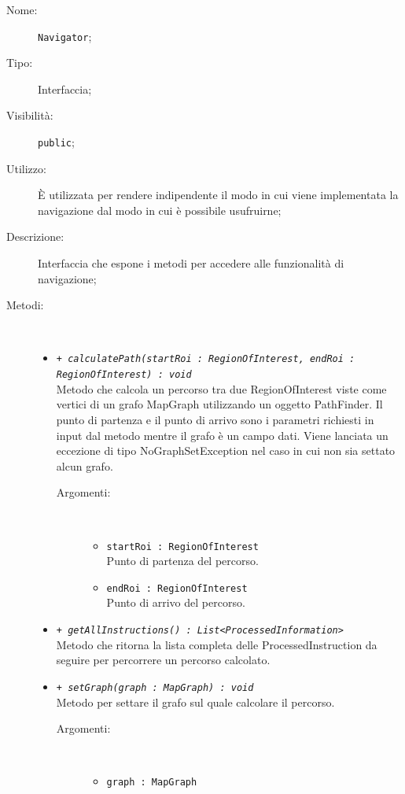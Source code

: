 \documentclass[../DefinizioneDiProdotto.tex]{subfiles}
\begin{document}
    \begin{description}
\item[Nome:] \texttt{Navigator};
\item[Tipo:] Interfaccia;
\item[Visibilità:] \texttt{public};
\item[Utilizzo:] È utilizzata per rendere indipendente il modo in cui viene implementata la navigazione dal modo in cui è possibile usufruirne;
\item[Descrizione:] Interfaccia che espone i metodi per accedere alle funzionalità di navigazione;
\item[Metodi:] \
\begin{itemize}
\item \texttt{+ \textit{calculatePath(startRoi : RegionOfInterest, endRoi : RegionOfInterest) : void}}\\
Metodo che calcola un percorso tra due RegionOfInterest viste come vertici di un grafo MapGraph utilizzando un oggetto PathFinder. Il punto di partenza e il punto di arrivo sono i parametri richiesti in input dal metodo mentre il grafo è un campo dati. Viene lanciata un eccezione di tipo NoGraphSetException nel caso in cui non sia settato alcun grafo.
 \begin{description}
\item[Argomenti:] \
\begin{itemize}
\item \texttt{startRoi : RegionOfInterest}\\
Punto di partenza del percorso.\item \texttt{endRoi : RegionOfInterest}\\
Punto di arrivo del percorso.\end{itemize}
\end{description}
\item \texttt{+ \textit{getAllInstructions() : List<ProcessedInformation>}}\\
Metodo che ritorna la lista completa delle ProcessedInstruction da seguire per percorrere un percorso calcolato.
 \item \texttt{+ \textit{setGraph(graph : MapGraph) : void}}\\
Metodo per settare il grafo sul quale calcolare il percorso.
 \begin{description}
\item[Argomenti:] \
\begin{itemize}
\item \texttt{graph : MapGraph}\\

\end{itemize}
\end{description}
\end{itemize}
\end{description}
\end{document}
